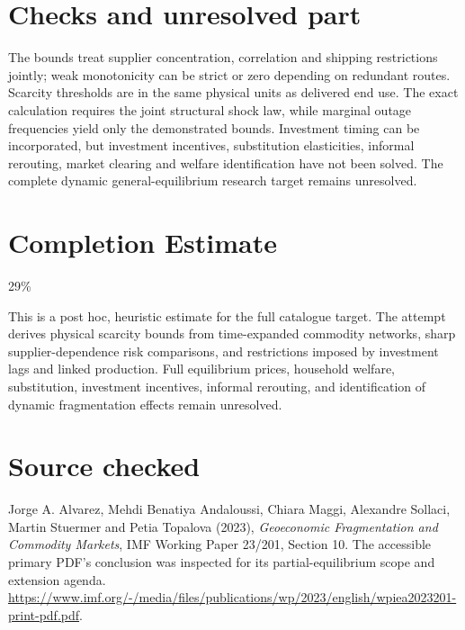 \documentclass[11pt]{article}
\begin{document}
\section*{Checks and unresolved part}
The bounds treat supplier concentration, correlation and shipping restrictions jointly; weak monotonicity can be strict or zero depending on redundant routes. Scarcity thresholds are in the same physical units as delivered end use. The exact calculation requires the joint structural shock law, while marginal outage frequencies yield only the demonstrated bounds. Investment timing can be incorporated, but investment incentives, substitution elasticities, informal rerouting, market clearing and welfare identification have not been solved. The complete dynamic general-equilibrium research target remains unresolved.

\section{Completion Estimate}
29\%

This is a post hoc, heuristic estimate for the full catalogue target.
The attempt derives physical scarcity bounds from time-expanded commodity networks, sharp supplier-dependence risk comparisons, and restrictions imposed by investment lags and linked production. Full equilibrium prices, household welfare, substitution, investment incentives, informal rerouting, and identification of dynamic fragmentation effects remain unresolved.

\section*{Source checked}
Jorge A. Alvarez, Mehdi Benatiya Andaloussi, Chiara Maggi, Alexandre Sollaci, Martin Stuermer and Petia Topalova (2023), \emph{Geoeconomic Fragmentation and Commodity Markets}, IMF Working Paper 23/201, Section 10. The accessible primary PDF's conclusion was inspected for its partial-equilibrium scope and extension agenda. \url{https://www.imf.org/-/media/files/publications/wp/2023/english/wpiea2023201-print-pdf.pdf}.
\end{document}
